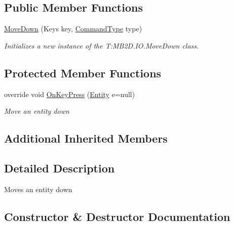 \subsection*{Public Member Functions}
\begin{DoxyCompactItemize}
\item 
\hyperlink{class_m_b2_d_1_1_i_o_1_1_move_down_ac486449a9efa2a903e55639592b25bf2}{Move\+Down} (Keys key, \hyperlink{namespace_m_b2_d_1_1_i_o_ab5f95f3fe9e652778b62bdf943168a68}{Command\+Type} type)
\begin{DoxyCompactList}\small\item\em Initializes a new instance of the T\+:\+M\+B2\+D.\+I\+O.\+Move\+Down class. \end{DoxyCompactList}\end{DoxyCompactItemize}
\subsection*{Protected Member Functions}
\begin{DoxyCompactItemize}
\item 
override void \hyperlink{class_m_b2_d_1_1_i_o_1_1_move_down_af93adf7def9f4869528ee2c86b474c19}{On\+Key\+Press} (\hyperlink{class_m_b2_d_1_1_entity_component_1_1_entity}{Entity} e=null)
\begin{DoxyCompactList}\small\item\em Move an entity down \end{DoxyCompactList}\end{DoxyCompactItemize}
\subsection*{Additional Inherited Members}


\subsection{Detailed Description}
Moves an entity down 



\subsection{Constructor \& Destructor Documentation}
\hypertarget{class_m_b2_d_1_1_i_o_1_1_move_down_ac486449a9efa2a903e55639592b25bf2}{}\label{class_m_b2_d_1_1_i_o_1_1_move_down_ac486449a9efa2a903e55639592b25bf2} 
